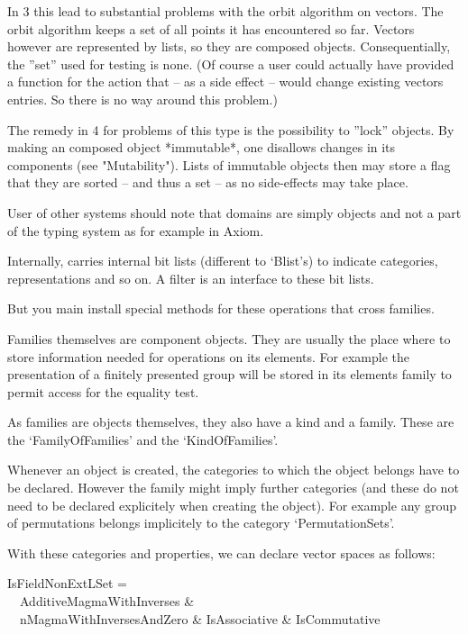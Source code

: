 In {\GAP} 3 this lead to substantial problems with the orbit algorithm on
vectors. The orbit algorithm keeps a set of all points it has encountered so
far. Vectors however are represented by lists, so they are composed objects.
Consequentially, the ''set'' used for testing is none. (Of course a
user could actually have provided a function for the action that
-- as a side effect -- would change existing vectors entries. So there is no
way around this problem.)

The remedy in {\GAP} 4 for problems of this type is the possibility to
''lock'' objects. By making an composed object *immutable*, one disallows
changes in its components (see "Mutability"). Lists of immutable objects
then may store a flag that they are sorted -- and thus a set -- as no
side-effects may take place.


\danger
User of other systems should note that domains
are simply objects and not a part of the typing system as for example in
Axiom.


\danger
Internally, {\GAP} carries internal bit lists (different to `Blist's) to
indicate categories, representations and so on. A filter is an interface to
these bit lists.


\danger
But you main install special methods for these operations that cross
families.


\danger
\label{storeinfamily}
Families themselves are component objects. They are usually the place where
to store
information needed for operations on its elements. For example the
presentation of a finitely presented group will be stored in its elements
family to permit access for the equality test.

\danger
As families are objects themselves, they also have a kind and a family.
These are the `FamilyOfFamilies' and the `KindOfFamilies'.


\danger
Whenever an object is created, the categories to which the object belongs
have to be declared. However the family might imply further categories (and
these do not need to be declared explicitely when creating the object).
For example any
group of permutations belongs implicitely to the category `PermutationSets'.


With these categories and properties, we can declare vector spaces as
follows:

IsFieldNonExtLSet = \\
\ \ AdditiveMagmaWithInverses \& \\
\ \ nMagmaWithInversesAndZero \& IsAssociative \& IsCommutative


